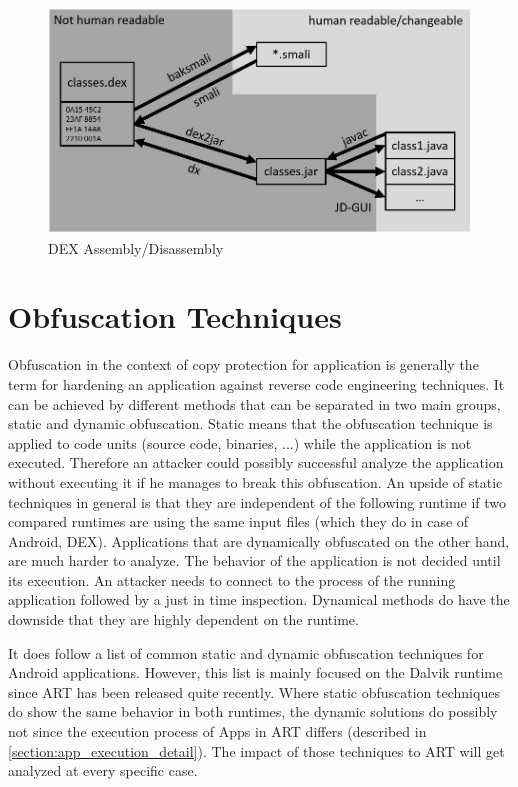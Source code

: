 \begin{figure}[htb]
  \includegraphics[width=\textwidth]{figures/dex_disassembly}
  \caption[DEX Assembly/Disassembly]{DEX Assembly/Disassembly}
  \label{fig:dex_disassembly}
\end{figure}


\section{Obfuscation Techniques}\label{section:obfuscation_techniques}
Obfuscation in the context of copy protection for application
is generally the term for hardening an application against
reverse code engineering techniques. It can be achieved by different methods
that can be separated in two main groups, static and dynamic obfuscation.
Static means that the obfuscation technique is applied to code units (source
code, binaries, ...) while the application is not executed. Therefore an
attacker could possibly successful analyze the application without executing it
if he manages to break this obfuscation. An upside of static techniques in general is that they are independent of the following runtime if two compared runtimes are using the same input files (which they do in case of Android, DEX).
Applications that are dynamically obfuscated on the other hand, are much harder to analyze. The behavior
of the application is not decided until its execution. An attacker needs to connect to the process of the running application followed by a just in time inspection. Dynamical methods do have the downside that they are highly dependent on the runtime.

It does follow a list of common static and dynamic obfuscation techniques
for Android applications. However, this list is mainly focused on
the Dalvik runtime since ART has been released quite recently.
Where static obfuscation techniques do show the same behavior in both
runtimes, the dynamic solutions do possibly not since the execution process
of Apps in ART differs (described in \autoref{section:app_execution_detail}).
The impact of those techniques to ART will get analyzed at every specific case.


